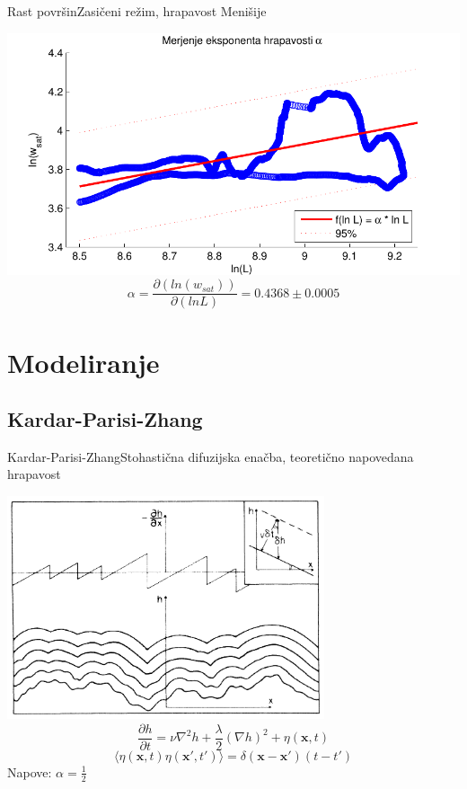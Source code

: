 \documentclass{beamer}
\begin{document}
\begin{frame}{Rast površin}{Zasičeni režim, hrapavost Menišije}
\begin{center}
  \footnotesize
  \hspace*{-0.04\textwidth}\includegraphics[width=1.1\textwidth]{slike/menisija-alfa}
  \begin{equation} \alpha = \frac{\partial ( ln (w_{sat}) ) }{\partial ( ln L )} =  0.4368 \pm 0.0005 \end{equation}
\end{center}
\end{frame}


\section{Modeliranje}

\subsection{Kardar-Parisi-Zhang}

\begin{frame}{Kardar-Parisi-Zhang}{Stohastična difuzijska enačba, teoretično napovedana hrapavost}
\begin{center}
  \footnotesize
  \includegraphics[width=0.7\textwidth]{slike/kpz}
  \begin{equation} \frac{\partial h}{\partial t} = \nu \nabla^2 h + \frac{\lambda}{2} (\nabla h)^2 + \eta (\mathbf{x},t) \end{equation}
  \begin{equation} \langle \eta(\mathbf{x},t) \eta(\mathbf{x'},t')\rangle = \delta(\mathbf{x}-\mathbf{x'})(t-t') \end{equation}
  Napove: $\alpha = \frac{1}{2}$
\end{center}
\end{frame}
\end{document}
